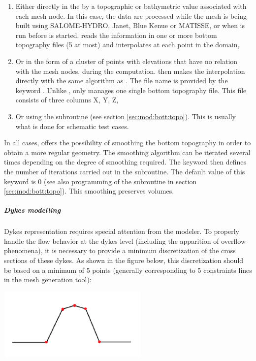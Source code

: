 \begin{enumerate}
\item Either directly in the  by a topographic
or bathymetric value associated with each mesh node.
In this case, the data are processed while the mesh is being built using
SALOME-HYDRO, Janet, Blue Kenue or MATISSE,
or when \stbtel is run before  is started.
\stbtel reads the information in one or more bottom topography files (5 at most)
and interpolates at each point in the domain,

\item Or in the form of a cluster of points with elevations that have
no relation with the mesh nodes, during the  computation.
 then makes the interpolation directly with the same algorithm as
\stbtel.
The file name is provided by the keyword .
Unlike \stbtel,  only manages one single bottom topography file.
This file consists of three columns X, Y, Z,

\item Or using the  subroutine (see section
\ref{sec:mod:bott:topo}).
This is usually what is done for schematic test cases.
\end{enumerate}

In all cases,  offers the possibility of smoothing the bottom
topography in order to obtain a more regular geometry.
The smoothing algorithm can be iterated several times depending on the degree of
smoothing required.
The keyword  then defines the number of iterations
carried out in the  subroutine.
The default value of this keyword is 0 (see also programming of the
 subroutine in section \ref{sec:mod:bott:topo}).
This smoothing preserves volumes.


\subparagraph{Dykes modelling}

Dykes representation requires special attention from the modeler.
To properly handle the flow behavior at the dykes level
(including the apparition of overflow phenomena), it is necessary to provide
a minimum discretization of the cross sections of these dykes.
As shown in the figure below, this discretization should be based on
a minimum of 5 points (generally corresponding to 5 constraints lines in the
mesh generation tool):

\includegraphics*[width=2.91in, height=1.39in, keepaspectratio=false]{./graphics/dyke.png}

